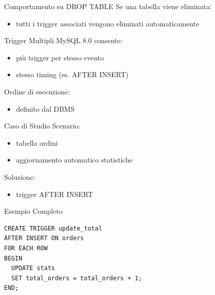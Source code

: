 \documentclass{beamer}
\begin{document}
	\begin{frame}{Comportamento su DROP TABLE}
		Se una tabella viene eliminata:
		
		\begin{itemize}
			\item tutti i trigger associati vengono eliminati automaticamente
		\end{itemize}
	\end{frame}
	
	\begin{frame}{Trigger Multipli}
		MySQL 8.0 consente:
		
		\begin{itemize}
			\item più trigger per stesso evento
			\item stesso timing (es. AFTER INSERT)
		\end{itemize}
		
		\bigskip
		
		Ordine di esecuzione:
		\begin{itemize}
			\item definito dal DBMS
		\end{itemize}
	\end{frame}
	
	\begin{frame}{Caso di Studio}
		Scenario:
		\begin{itemize}
			\item tabella ordini
			\item aggiornamento automatico statistiche
		\end{itemize}
		
		\bigskip
		
		Soluzione:
		\begin{itemize}
			\item trigger AFTER INSERT
		\end{itemize}
	\end{frame}
	
	\begin{frame}[fragile]{Esempio Completo}
		\begin{lstlisting}
CREATE TRIGGER update_total
AFTER INSERT ON orders
FOR EACH ROW
BEGIN
  UPDATE stats
  SET total_orders = total_orders + 1;
END;
		\end{lstlisting}
	\end{frame}
	
\end{document}

